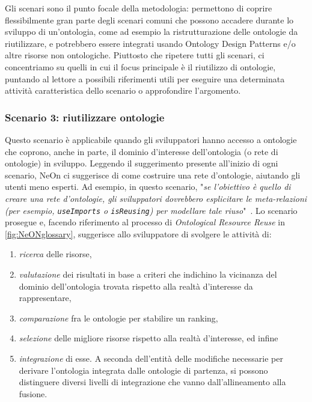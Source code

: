 Gli scenari sono il punto focale della metodologia: permettono di coprire flessibilmente gran parte degli scenari comuni che possono accadere durante lo sviluppo di un'ontologia, come ad esempio la ristrutturazione delle ontologie da riutilizzare, e potrebbero essere integrati usando Ontology Design Patterns \cite{ODP} e/o altre risorse non ontologiche. Piuttosto che ripetere tutti gli scenari, ci concentriamo su quelli in cui il focus principale è il riutilizzo di ontologie, puntando al lettore a possibili riferimenti utili per eseguire una determinata attività caratteristica dello scenario o approfondire l'argomento.
\subsubsection*{Scenario 3: riutilizzare ontologie}
\label{sec:Scenario3}
Questo scenario è applicabile quando gli sviluppatori hanno accesso a ontologie che coprono, anche in parte, il dominio d'interesse dell'ontologia (o rete di ontologie) in sviluppo. Leggendo il suggerimento presente all'inizio di ogni scenario, NeOn ci suggerisce di come costruire una rete d'ontologie, aiutando gli utenti meno esperti. Ad esempio, in questo scenario, "\textsl{se l'obiettivo è quello di creare una rete d'ontologie, gli sviluppatori dovrebbero esplicitare le meta-relazioni (per esempio, \texttt{useImports} o \texttt{isReusing}) per modellare tale riuso}"~\cite{NeOn}. Lo scenario prosegue e, facendo riferimento al processo di \textit{Ontological Resource Reuse} in \autoref{fig:NeONglossary}, suggerisce allo sviluppatore di svolgere le attività di:
 \begin{enumerate}
 	\item \textit{ricerca} delle risorse,
 	\item \textit{valutazione} dei risultati in base a criteri che indichino la vicinanza del dominio dell'ontologia trovata rispetto alla realtà d'interesse da rappresentare, 
 	\item \textit{comparazione} fra le ontologie per stabilire un ranking,
 	\item \textit{selezione} delle migliore risorse rispetto alla realtà d'interesse, ed infine
 	\item \textit{integrazione} di esse. A seconda dell'entità delle modifiche necessarie per derivare l'ontologia integrata dalle ontologie di partenza, si possono distinguere diversi livelli di integrazione che vanno dall'allineamento alla fusione.
 \end{enumerate}

